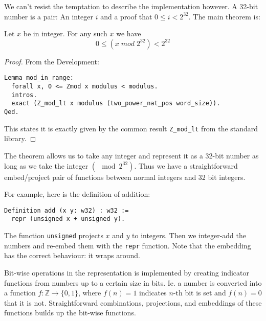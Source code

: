 We can't resist the temptation to describe the implementation however. A
32-bit number is a pair: An integer $i$ and a proof that $0 \leq i <
2^{32}$. The main theorem is:
\begin{lem}
  Let $x$ be in integer. For any such $x$ we have
  \begin{equation*}
    0 \leq (x \;mod\; 2^{32}) < 2^{32}
  \end{equation*}
\end{lem}
\begin{proof}
  From the \coq{} Development:
\begin{verbatim}
Lemma mod_in_range:
  forall x, 0 <= Zmod x modulus < modulus.
  intros.
  exact (Z_mod_lt x modulus (two_power_nat_pos word_size)).
Qed.
\end{verbatim}
  This states it is exactly given by the common result
  \texttt{Z\_mod\_lt} from the \coq{} standard library.
\end{proof}
The theorem allows us to take any integer and represent it as a 32-bit
number as long as we take the integer $(\mod 2^{32})$. Thus we have a
straightforward embed/project pair of functions between normal
integers and 32 bit integers.

For example, here is the definition of addition:
\begin{verbatim}
Definition add (x y: w32) : w32 :=
  repr (unsigned x + unsigned y).
\end{verbatim}
The function \texttt{unsigned} projects $x$ and $y$ to integers. Then
we integer-add the numbers and re-embed them with the \texttt{repr}
function. Note that the embedding has the correct behaviour: it wraps
around.

Bit-wise operations in the representation is implemented by creating
indicator functions from numbers up to a certain size in bits. Ie. a
number is converted into a function $f \colon \mathbb{Z} \to \{0,
1\}$, where $f(n) = 1$ indicates $n$-th bit is set and $f(n) = 0$ that
it is not. Straightforward combinations, projections, and embeddings
of these functions builds up the bit-wise functions.

